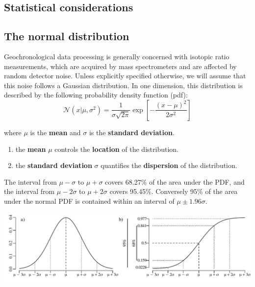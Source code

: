 \begin{refsection}
\chapter{Statistical considerations}
\label{ch:statistics}

\section{The normal distribution}
\label{sec:Gauss}

Geochronological data processing is generally concerned with isotopic
ratio measurements, which are acquired by mass spectrometers and are
affected by random detector noise. Unless explicitly specified
otherwise, we will assume that this noise follows a Gaussian
distribution. In one dimension, this distribution is described by the
following probability density function (pdf):
\begin{equation}
  \mathcal{N}(x|\mu,\sigma^2) = \frac{1}{\sigma\sqrt{2\pi}}
  \exp\!\left[-\frac{(x-\mu)^2}{2\sigma^2}\right]
  \label{eq:gauss}
\end{equation}

\noindent where $\mu$ is the \textbf{mean} and $\sigma$ is the
\textbf{standard deviation}.

\begin{enumerate}
\item the \textbf{mean} $\mu$ controls the \textbf{location} of the
  distribution.
\item the \textbf{standard deviation} $\sigma$ quantifies the
  \textbf{dispersion} of the distribution.
\end{enumerate}

The interval from $\mu-\sigma$ to $\mu+\sigma$ covers 68.27\% of the
area under the PDF, and the interval from $\mu-2\sigma$ to
$\mu+2\sigma$ covers 95.45\%. Conversely 95\% of the area under the
normal PDF is contained within an interval of $\mu\pm{1.96}\sigma$.

\noindent\includegraphics[width=\textwidth]{../figures/2sigma.pdf}
\begingroup {}
\label{fig:2sigma}
\endgroup


\end{refsection}
